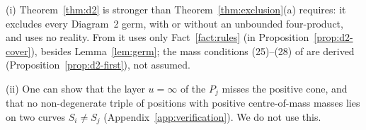 \begin{remark}\label{rem:d2-scope}
(i) Theorem~\ref{thm:d2} is stronger than Theorem~\ref{thm:exclusion}(a) requires: it excludes
every Diagram~2 germ, with or without an unbounded four-product, and uses no reality.  From
\cite{AK} it uses only Fact~\ref{fact:rules} (in Proposition~\ref{prop:d2-cover}), besides
Lemma~\ref{lem:germ}; the mass conditions (25)--(28) of \cite[\S8.2]{AK} are derived
(Proposition~\ref{prop:d2-first}), not assumed.

(ii) One can show that the layer $u=\infty$ of the $P_j$ misses the positive cone, and that no
non-degenerate triple of positions with positive centre-of-mass masses lies on two curves
$S_i\ne S_j$ (Appendix~\ref{app:verification}).  We do not use this.
\end{remark}

